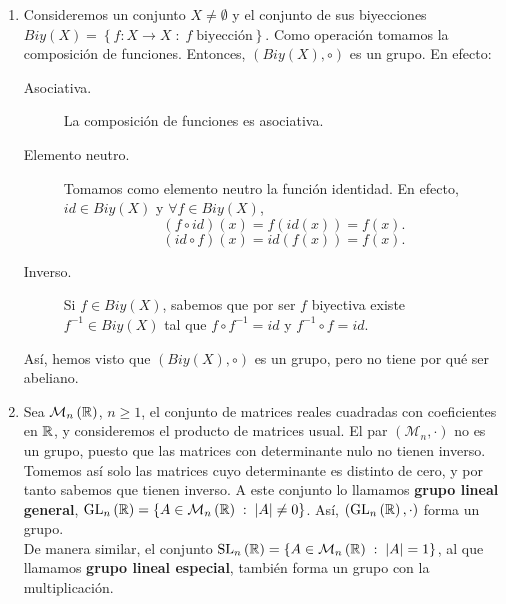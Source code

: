 \begin{eg}
\begin{enumerate}
	\item Consideremos un conjunto $\displaystyle X \neq \emptyset $ y el conjunto de sus biyecciones $\displaystyle Biy\left(X\right) = \left\{ f : X \to X \; : \; f \; \text{biyección}\right\}  $. Como operación tomamos la composición de funciones. Entonces, $\displaystyle \left(Biy\left(X\right), \circ\right) $ es un grupo. En efecto:
		\begin{description}
		\item[Asociativa.] La composición de funciones es asociativa.
		\item[Elemento neutro.] Tomamos como elemento neutro la función identidad. En efecto, $\displaystyle id \in Biy\left(X\right) $ y $\displaystyle \forall f \in Biy\left(X\right) $, 
			\[\left(f\circ id \right)\left(x\right) = f\left(id \left(x\right)\right) = f\left(x\right) .\]
		\[\left(id \circ f\right)\left(x\right) = id \left(f\left(x\right)\right) = f\left(x\right) .\]
	\item[Inverso.]	Si $\displaystyle f \in Biy\left(X\right) $, sabemos que por ser $\displaystyle f $ biyectiva existe $\displaystyle f^{-1} \in Biy\left(X\right) $ tal que $\displaystyle f \circ f^{-1} = id $ y $\displaystyle f^{-1} \circ f = id $. 
		\end{description}
	Así, hemos visto que $\displaystyle \left(Biy\left(X\right), \circ\right) $ es un grupo, pero no tiene por qué ser abeliano.
\item Sea $\displaystyle \mathcal{M}_{n}\left(\mathbb{R}\right) $, $\displaystyle n \geq 1 $, el conjunto de matrices reales cuadradas con coeficientes en $\displaystyle \mathbb{R} $, y consideremos el producto de matrices usual. El par $\displaystyle \left(\mathcal{M}_{n}, \cdot\right) $ no es un grupo, puesto que las matrices con determinante nulo no tienen inverso. \\ 
	Tomemos así solo las matrices cuyo determinante es distinto de cero, y por tanto sabemos que tienen inverso. A este conjunto lo llamamos \textbf{grupo lineal general}, $\displaystyle \operatorname{GL}_{n}\left(\mathbb{R}\right) = \left\{ A \in \mathcal{M}_{n}\left(\mathbb{R}\right) \; : \; \left|A\right| \neq 0\right\}  $. Así, $\displaystyle \left(\operatorname{GL}_{n}\left(\mathbb{R}\right), \cdot\right) $ forma un grupo. \\
	De manera similar, el conjunto $\displaystyle \operatorname{SL}_{n}\left(\mathbb{R}\right) = \left\{ A \in \mathcal{M}_{n}\left(\mathbb{R}\right) \; : \; \left|A\right| = 1\right\}  $, al que llamamos \textbf{grupo lineal especial}, también forma un grupo con la multiplicación. 
\end{enumerate}
\end{eg}
